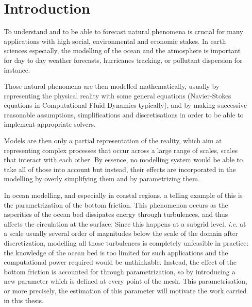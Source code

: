 \documentclass[../../Main_ManuscritThese.tex]{subfiles}
\begin{document}
\pagestyle{introStyle}
\chapter*{Introduction}
\TitleBtwLines
{}
{}
\label{chap:Introduction}
To understand and to be able to forecast natural phenomena is crucial
for many applications with high social, environmental and economic
stakes.  In earth sciences especially, the modelling of the ocean and
the atmosphere is important for day to day weather forecasts,
hurricanes tracking, or pollutant dispersion for instance. %

Those natural phenomena are then modelled mathematically, usually by
representing the physical reality with some general equations
(Navier-Stokes equations in Computational Fluid Dynamics typically),
and by making successive reasonable assumptions, simplifications and
discretisations in order to be able to implement appropriate
solvers.%

Models are then only a partial representation of the reality, which
aim at representing complex processes that occur across a large range
of scales, scales that interact with each other. By essence, no
modelling system would be able to take all of those into account but
instead, their effects are incorporated in the modelling by overly
simplifying them and by {parametrizing} them.

In ocean modelling, and especially in coastal regions, a telling
example of this is the parametrization of the bottom friction. This
phenomenon occurs as the asperities of the ocean bed dissipates energy
through turbulences, and thus affects the circulation at the
surface. Since this happens at a subgrid level, \emph{i.e.} at a scale
usually several order of magnitudes below the scale of the domain
after discretization, modelling all those turbulences is completely
unfeasible in practice: the knowledge of the ocean bed is too limited
for such applications and the computational power required would be
unthinkable. Instead, the effect of the bottom friction is accounted
for through parametrization, so by introducing a new parameter which
is defined at every point of the mesh.
This parametrisation, or more precisely, the estimation of this
parameter will motivate the work carried in this thesis.
\end{document}
